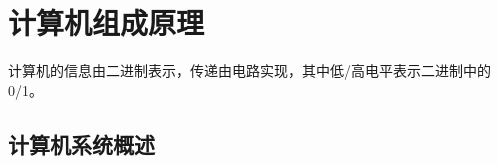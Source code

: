 \section{计算机组成原理}
\begin{intro}
    计算机的信息由二进制表示，传递由电路实现，其中低/高电平表示二进制中的0/1。
\end{intro}

\subsection{计算机系统概述}
